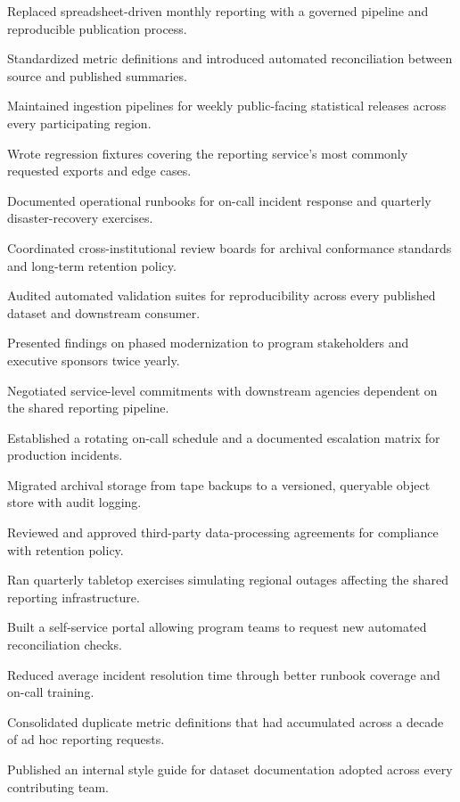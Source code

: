 \documentclass[fontsize=11pt, margin=narrow, medium=print]{careerdossier-resume}
\begin{document}
\begin{CDossierEntry}[title = {Modernization Program}, organization = {Continental Reliability Consortium}, location = {Ottawa, ON}, dates = {2010--Present}]
\begin{CDossierItemize}
    \item Replaced spreadsheet-driven monthly reporting with a governed pipeline and reproducible publication process.
    \item Standardized metric definitions and introduced automated reconciliation between source and published summaries.
    \item Maintained ingestion pipelines for weekly public-facing statistical releases across every participating region.
    \item Wrote regression fixtures covering the reporting service's most commonly requested exports and edge cases.
    \item Documented operational runbooks for on-call incident response and quarterly disaster-recovery exercises.
    \item Coordinated cross-institutional review boards for archival conformance standards and long-term retention policy.
    \item Audited automated validation suites for reproducibility across every published dataset and downstream consumer.
    \item Presented findings on phased modernization to program stakeholders and executive sponsors twice yearly.
    \item Negotiated service-level commitments with downstream agencies dependent on the shared reporting pipeline.
    \item Established a rotating on-call schedule and a documented escalation matrix for production incidents.
    \item Migrated archival storage from tape backups to a versioned, queryable object store with audit logging.
    \item Reviewed and approved third-party data-processing agreements for compliance with retention policy.
    \item Ran quarterly tabletop exercises simulating regional outages affecting the shared reporting infrastructure.
    \item Built a self-service portal allowing program teams to request new automated reconciliation checks.
    \item Reduced average incident resolution time through better runbook coverage and on-call training.
    \item Consolidated duplicate metric definitions that had accumulated across a decade of ad hoc reporting requests.
    \item Published an internal style guide for dataset documentation adopted across every contributing team.

\end{CDossierItemize}
\end{CDossierEntry}
\end{document}
